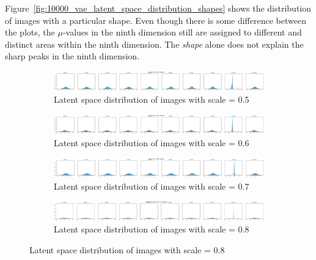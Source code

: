 Figure~\ref{fig:10000_vae_latent_space_distribution_shapes} shows the distribution of images with a particular shape.
Even though there is some difference between the plots, the $\mu$-values in the ninth dimension still are assigned to different and distinct areas within the ninth dimension.
The \textit{shape} alone does not explain the sharp peaks in the ninth dimension.

\begin{figure}
    \centering
    \begin{subfigure}{\textwidth}
        \centering
        \includegraphics[width=\textwidth]{images/latent_space_entanglement/vae_dsprites_lf_10000_dist_scale_0_5.png}
        \caption{Latent space distribution of images with scale = 0.5}
    \end{subfigure}
    \begin{subfigure}{\textwidth}
        \centering
        \includegraphics[width=\textwidth]{images/latent_space_entanglement/vae_dsprites_lf_10000_dist_scale_0_6.png}
        \caption{Latent space distribution of images with scale = 0.6}
    \end{subfigure}
    \begin{subfigure}{\textwidth}
        \centering
        \includegraphics[width=\textwidth]{images/latent_space_entanglement/vae_dsprites_lf_10000_dist_scale_0_7.png}
        \caption{Latent space distribution of images with scale = 0.7}
    \end{subfigure}
    \begin{subfigure}{\textwidth}
        \centering
        \includegraphics[width=\textwidth]{images/latent_space_entanglement/vae_dsprites_lf_10000_dist_scale_0_8.png}
        \caption{Latent space distribution of images with scale = 0.8}
    \end{subfigure}

\end{figure}
